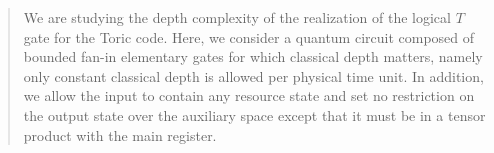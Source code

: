 

\begin{abstract}
We are studying the depth complexity of the realization of the logical $T$ gate for the Toric code. Here, we consider a quantum circuit composed of bounded fan-in elementary gates for which classical depth matters, namely only constant classical depth is allowed per physical time unit. In addition, we allow the input to contain any resource state and set no restriction on the output state over the auxiliary space except that it must be in a tensor product with the main register.
\end{abstract}
